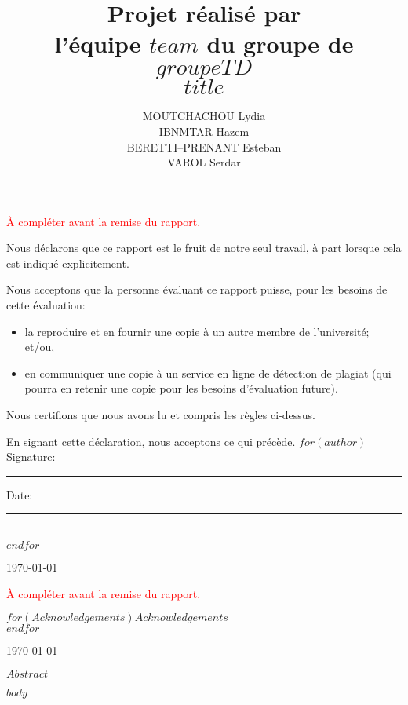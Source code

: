 \documentclass[mstat,12pt]{unswthesis}
\title{Projet réalisé par\\[0.5cm] l'équipe $team$ du groupe de $groupeTD$ \\[3cm]$title$}
\author{
  \begin{tabular}{c}
  MOUTCHACHOU Lydia \\
  IBNMTAR Hazem \\
  BERETTI--PRENANT Esteban \\
  VAROL Serdar
  \end{tabular}
}
\begin{document}
\beforepreface




\textcolor{red}{À compléter avant la remise du rapport.}

\vskip 2pc \noindent Nous déclarons que ce rapport est le fruit de notre seul travail, à part lorsque cela est indiqué  explicitement. 

\vskip 2pc  \noindent Nous acceptons que la personne évaluant ce rapport puisse, pour les besoins de cette évaluation:
\begin{itemize}
\item la reproduire et en fournir une copie à un autre membre de l'université; et/ou,
\item en communiquer une copie à un service en ligne de détection de plagiat (qui pourra en retenir une copie pour les besoins d'évaluation future).
\end{itemize}

\vskip 2pc \noindent Nous certifions que nous avons lu et compris les règles ci-dessus.\vspace{24pt}

\vskip 2pc \noindent En signant cette déclaration, nous acceptons ce qui précède.
\vskip 2pc \noindent
$for(author)$
Signature: \rule{7cm}{0.25pt} \hfill Date: \rule{4cm}{0.25pt} \\[1cm]
$endfor$
\vskip 1pc


{\bigskip\bigskip\bigskip\noindent} \today




\textcolor{red}{À compléter avant la remise du rapport.}

{\bigskip}$for(Acknowledgements)$$Acknowledgements$\\[1cm] $endfor$

{\bigskip\bigskip\bigskip\noindent} \today




$Abstract$



\afterpreface





%
%






$body$
\end{document}

